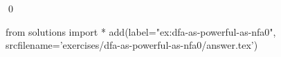 
\begin{ex} 
  \label{ex:dfa-as-powerful-as-nfa0}
  
  \qed
\end{ex} 
\begin{python0}
from solutions import *
add(label="ex:dfa-as-powerful-as-nfa0",
    srcfilename='exercises/dfa-as-powerful-as-nfa0/answer.tex') 
\end{python0}
